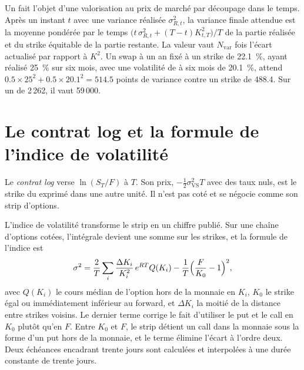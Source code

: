 Un  fait l'objet d'une valorisation au prix de marché par découpage dans le temps. Après un instant $t$ avec une variance réalisée
$\sigma_{R,t}^2$, la variance finale attendue est la moyenne pondérée par le temps
$\bigl(t\,\sigma_{R,t}^2+(T-t)K_{t,T}^2\bigr)/T$ de la partie réalisée et du strike équitable de la
partie restante. La valeur vaut $N_{\mathrm{var}}$ fois l'écart actualisé par rapport à $K^2$. Un swap à un an fixé à un strike de
22.1~\%, ayant réalisé 25~\% sur six mois, avec une volatilité de  à six mois de 20.1~\%, attend
$0.5\times25^2+0.5\times20.1^2=514.5$ points de variance contre un strike de 488.4. Sur un  de
2\,262, il vaut 59\,000.

\section{Le contrat log et la formule de l'indice de volatilité}

\begin{definition}\label{def:dv:variance-swaps-and-volatility-derivatives:log}
Le \emph{contrat log} verse $\ln(S_T/F)$ à $T$. Son prix, $-\frac12\sigma_{\mathrm{VS}}^2T$
avec des taux nuls, est le strike du  exprimé dans une autre unité. Il n'est pas coté et se négocie comme son
strip d'options.
\end{definition}

L'indice de volatilité transforme le strip en un chiffre publié. Sur une chaîne d'options cotées, l'intégrale devient une
somme sur les strikes, et la formule de l'indice est
\[
\sigma^2=\frac2T\sum_i\frac{\Delta K_i}{K_i^2}\,e^{RT}Q(K_i)-\frac1T\Bigl(\frac F{K_0}-1\Bigr)^2,
\]
avec $Q(K_i)$ le cours médian de l'option hors de la monnaie en $K_i$, $K_0$ le strike égal ou immédiatement inférieur au
forward, et $\Delta K_i$ la moitié de la distance entre strikes voisins. Le dernier terme corrige le fait d'utiliser
le put et le call en $K_0$ plutôt qu'en $F$. Entre $K_0$ et $F$, le strip détient un call dans la monnaie sous la forme
d'un put hors de la monnaie, et le terme élimine l'écart à l'ordre deux. Deux échéances encadrant trente
jours sont calculées et interpolées à une durée constante de trente jours.

